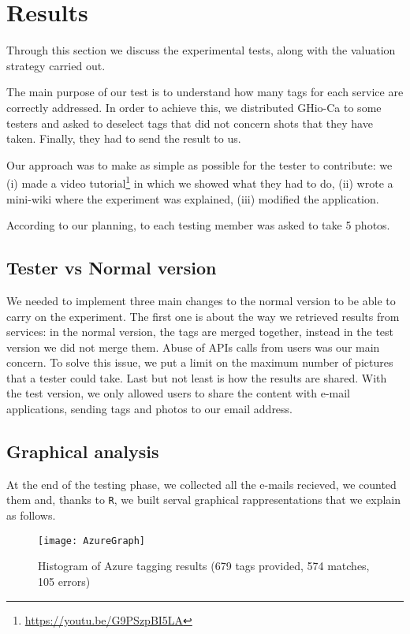 \section{Results}
\label{sec:results}

Through this section we discuss the experimental tests, along with the valuation strategy carried out. 

The main purpose of our test is to understand how many tags for each service are correctly addressed. In order to achieve this, we distributed GHio-Ca to some testers and asked to deselect tags that did not concern shots that they have taken. Finally, they had to send the result to us.

Our approach was to make as simple as possible for the tester to contribute: we (i) made a video tutorial\footnote{\url{https://youtu.be/G9PSzpBI5LA}} in which we showed what they had to do, (ii) wrote a mini-wiki where the experiment was explained, (iii) modified the application. 

According to our planning, to each testing member was asked to take 5 photos.

\subsection{Tester vs Normal version}

We needed to implement three main changes to the normal version to be able to carry on the experiment. The first one is about the way we retrieved results from services: in the normal version, the tags are merged together, instead in the test version we did not merge them.
Abuse of APIs calls from users was our main concern. To solve this issue, we put a limit on the maximum number of pictures that a tester could take.
Last but not least is how the results are shared. With the test version, we only allowed users to share the content with e-mail applications, sending tags and photos to our email address.


\subsection{Graphical analysis}

At the end of the testing phase, we collected all the e-mails recieved, we counted them and, thanks to \texttt{R}, we built serval graphical rappresentations that we explain as follows.

\begin{figure}[H]
\centering
\texttt{[image: AzureGraph]}
\caption{Histogram of Azure tagging results (679 tags provided, 574 matches, 105 errors)}
\label{img:testgraphsazure}
\end{figure}


